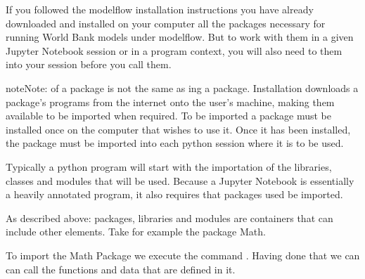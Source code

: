 \documentclass[letterpaper,10pt,english]{jupyterBook}
\begin{document}
\sphinxAtStartPar
If you followed the modelflow installation instructions you have already downloaded and installed on your computer all the packages necessary for running World Bank models under modelflow.  But to work with them in a given Jupyter Notebook session or in a program context, you will also need to  them into your session before you call them.

\begin{sphinxadmonition}{note}{Note:}
\sphinxAtStartPar
{} of a package is not the same as ing a package. Installation downloads a package’s programs from the internet onto the user’s machine, making them available to be imported when required.  To be imported a package must be installed once on the computer that wishes to use it.  Once it has been installed, the package must be imported into each python session where it is to be used.
\end{sphinxadmonition}

\sphinxAtStartPar
Typically a python program will start with the importation of the libraries, classes and modules that will be used.  Because a Jupyter Notebook is essentially a heavily annotated program, it also requires that packages used be imported.

\sphinxAtStartPar
As described above: packages, libraries and modules are containers that can include other elements.  Take for example the package Math.

\sphinxAtStartPar
To import the Math Package we execute the command .  Having done that we can can call the functions and data that are defined in it.
\end{document}
